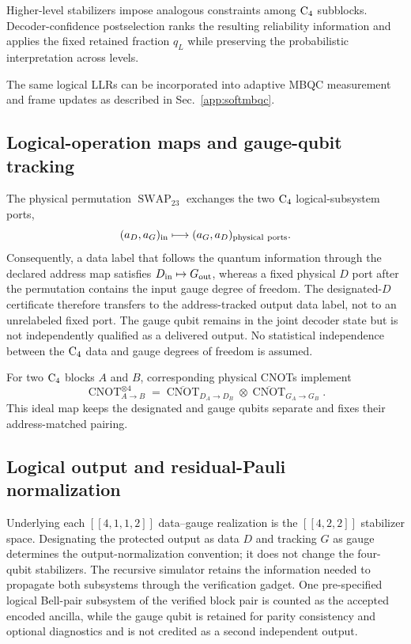 \documentclass[aps,
prx,
superscriptaddress,
reprint,
longbibliography,
floatfix]{revtex4-2}
\begin{document}
Higher-level stabilizers impose analogous constraints among ${\rm C_4}$ subblocks. Decoder-confidence postselection ranks the resulting reliability information and applies the fixed retained fraction $q_L$ while preserving the probabilistic interpretation across levels.

The same logical LLRs can be incorporated into adaptive MBQC measurement and frame updates as described in Sec.~\ref{app:softmbqc}.

 


\subsection{Logical-operation maps and gauge-qubit tracking}
\label{app:ds_mapping}
The physical permutation $\operatorname{SWAP}_{23}$ exchanges the two ${\rm C_4}$ logical-subsystem ports,
\begin{equation}
 (a_D,a_G)_{\rm in}\longmapsto(a_G,a_D)_{\rm physical\ ports}.
\label{eq:ds_swap_port_map}
\end{equation}
Consequently, a data label that follows the quantum information through the declared address map satisfies $D_{\rm in}\mapsto G_{\rm out}$, whereas a fixed physical $D$ port after the permutation contains the input gauge degree of freedom. The designated-$D$ certificate therefore transfers to the address-tracked output data label, not to an unrelabeled fixed port. The gauge qubit remains in the joint decoder state but is not independently qualified as a delivered output.
No statistical independence between the ${\rm C_4}$ data and gauge degrees of freedom is assumed.

For two ${\rm C_4}$ blocks $A$ and $B$, corresponding physical CNOTs implement
\begin{equation}
 \operatorname{CNOT}^{\otimes4}_{A\rightarrow B}
 =\overline{\operatorname{CNOT}}_{D_A\rightarrow D_B}
  \otimes\overline{\operatorname{CNOT}}_{G_A\rightarrow G_B}.
\label{eq:ds_cnot_map}
\end{equation}
This ideal map keeps the designated and gauge qubits separate and fixes their address-matched pairing.


\subsection{Logical output and residual-Pauli normalization}\label{app:c4_two_logical_subsystems}
Underlying each $[[4,1,1,2]]$ data--gauge realization is the $[[4,2,2]]$ stabilizer space. Designating the protected output as data $D$ and tracking $G$ as gauge determines the output-normalization convention; it does not change the four-qubit stabilizers. The recursive simulator retains the information needed to propagate both subsystems through the verification gadget. One pre-specified logical Bell-pair subsystem of the verified block pair is counted as the accepted encoded ancilla, while the gauge qubit is retained for parity consistency and optional diagnostics and is not credited as a second independent output.
\end{document}
